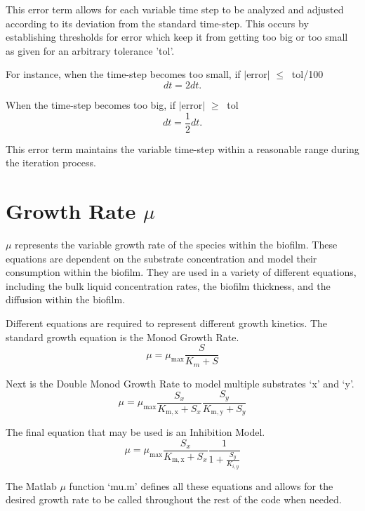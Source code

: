 \documentclass[letterpaper, twoside]{article}
\numberwithin{equation}{section}
\begin{document}
This error term allows for each variable time step to be analyzed and adjusted according to its deviation from the standard time-step. This occurs by establishing thresholds for error which keep it from getting too big or too small as given for an arbitrary tolerance 'tol'.

For instance, when the time-step becomes too small, if $|$error$|$ $ \leq\ $ tol/100
\begin{equation}
  dt = 2 dt.
\end{equation}

When the time-step becomes too big, if $|$error$|$ $ \geq\ $ tol
\begin{equation}
  dt = \frac{1}{2} dt.
\end{equation}

This error term maintains the variable time-step within a reasonable range during the iteration process.

\section{Growth Rate $\mu$}\label{sec:mu}
$\mu$ represents the variable growth rate of the species within the biofilm. These equations are dependent on the substrate concentration and model their consumption within the biofilm. They are used in a variety of different equations, including the bulk liquid concentration rates, the biofilm thickness, and the diffusion within the biofilm.

Different equations are required to represent different growth kinetics. The standard growth equation is the Monod Growth Rate.
\begin{equation} \label{eq: MonodGrowthRate}
  \mu=\mu_\mathrm{max} \frac{S}{K_m + S}
\end{equation}

Next is the Double Monod Growth Rate to model multiple substrates `x' and `y'.
\begin{equation} \label{eq: DoubleMonodGrowthRate}
  \mu=\mu_\mathrm{max} \frac{S_x}{K_\mathrm{m,x} + S_x} \frac{S_y}{K_\mathrm{m,y} + S_y}
\end{equation}

The final equation that may be used is an Inhibition Model.
\begin{equation} \label{eq: Inhibition}
  \mu=\mu_\mathrm{max} \frac{S_x}{K_\mathrm{m,x} + S_x} \frac{1}{1 + \frac{S_y}{K_{i,y}}}
\end{equation}

The Matlab $\mu$ function `mu.m' defines all these equations and allows for the desired growth rate to be called throughout the rest of the code when needed.
  
\end{document}
